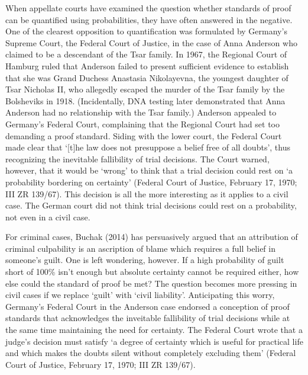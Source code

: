 \documentclass[10pt,dvipsnames,enabledeprecatedfontcommands]{scrartcl}
\begin{document}
When appellate courts have examined the question whether standards of
proof can be quantified using probabilities, they have often answered in
the negative. One of the clearest opposition to quantification was
formulated by Germany's Supreme Court, the Federal Court of Justice, in
the case of Anna Anderson who claimed to be a descendant of the Tsar
family. In 1967, the Regional Court of Hamburg ruled that Anderson
failed to present sufficient evidence to establish that she was Grand
Duchess Anastasia Nikolayevna, the youngest daughter of Tsar Nicholas
II, who allegedly escaped the murder of the Tsar family by the
Bolsheviks in 1918. (Incidentally, DNA testing later demonstrated that
Anna Anderson had no relationship with the Tsar family.) Anderson
appealed to Germany's Federal Court, complaining that the Regional Court
had set too demanding a proof standard. Siding with the lower court, the
Federal Court made clear that `{[}t{]}he law does not presuppose a
belief free of all doubts', thus recognizing the inevitable fallibility
of trial decisions. The Court warned, however, that it would be `wrong'
to think that a trial decision could rest on `a probability bordering on
certainty' (Federal Court of Justice, February 17, 1970; III ZR 139/67).
This decision is all the more interesting as it applies to a civil case.
The German court did not think trial decisions could rest on a
probability, not even in a civil case.

For criminal cases, Buchak (2014) has persuasively argued that an
attribution of criminal culpability is an ascription of blame which
requires a full belief in someone's guilt. One is left wondering,
however. If a high probability of guilt short of 100\% isn't enough but
absolute certainty cannot be required either, how else could the
standard of proof be met? The question becomes more pressing in civil
cases if we replace `guilt' with `civil liability'. Anticipating this
worry, Germany's Federal Court in the Anderson case endorsed a
conception of proof standards that acknowledges the inveitable
fallibility of trial decisions while at the same time maintaining the
need for certainty. The Federal Court wrote that a judge's decision must
satisfy `a degree of certainty which is useful for practical life and
which makes the doubts silent without completely excluding them'
(Federal Court of Justice, February 17, 1970; III ZR 139/67).
\end{document}
